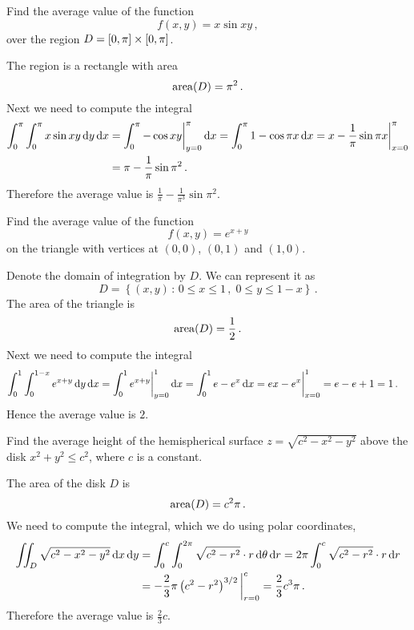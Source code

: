 \begin{question}
Find the average value of the function
\[
f(x,y) = x \sin xy\,,
\]
over the region $D = [0,\pi] \times [0,\pi]$.
\end{question}

\begin{solution}
The region is a rectangle with area
\[
\operatorname{area}(D) = \pi^2\,.
\]
Next we need to compute the integral
\begin{align*}
\int_0^\pi \int_0^\pi x \sin xy \,\mathrm{d} y \,\mathrm{d} x
&= \int_0^\pi -\cos xy \bigg|_{y=0}^\pi \,\mathrm{d} x
= \int_0^\pi 1 - \cos \pi x \,\mathrm{d} x
= x - \frac 1\pi \sin \pi x \bigg|_{x=0}^\pi \\
&= \pi - \frac 1\pi \sin \pi^2\,.
\end{align*}
Therefore the average value is $\frac 1\pi - \frac 1{\pi^3} \sin \pi^2$.
\end{solution}

\begin{question}
Find the average value of the function
\[
f(x,y) = e^{x+y}
\]
on the triangle with vertices at $(0,0)$, $(0,1)$ and $(1,0)$.
\end{question}

\begin{solution}
Denote the domain of integration by $D$. We can represent it as
\[
D = \left\{ (x,y) \,:\, 0 \leq x \leq 1\,,\; 0 \leq y \leq 1-x \right\}\,.
\]
The area of the triangle is
\[
\operatorname{area}(D) = \frac 12\,.
\]
Next we need to compute the integral
\begin{align*}
\int_0^1 \int_0^{1-x} e^{x+y} \,\mathrm{d} y \,\mathrm{d} x 
&= \int_0^1 e^{x+y} \bigg|_{y=0}^1 \,\mathrm{d} x
= \int_0^1 e - e^x \,\mathrm{d} x
= ex - e^x \bigg|_{x=0}^1 = e - e + 1 = 1\,.
\end{align*}
Hence the average value is $2$.
\end{solution}

\begin{question}
Find the average height of the hemispherical surface $z = \sqrt{c^2 - x^2 - y^2}$ above the disk $x^2 + y^2 \leq c^2$, where $c$ is a constant.
\end{question}

\begin{solution}
The area of the disk $D$ is
\[
\operatorname{area}(D) = c^2 \pi\,.
\]
We need to compute the integral, which we do using polar coordinates,
\begin{align*}
\iint_D \sqrt{c^2 - x^2 - y^2} \,\mathrm{d} x \,\mathrm{d} y
&= \int_0^c \int_0^{2\pi} \sqrt{c^2 - r^2} \cdot r \,\mathrm{d} \theta \,\mathrm{d} r
= 2\pi \int_0^c \sqrt{c^2 - r^2} \cdot r \,\mathrm{d} r \\
&= -\frac 23 \pi \left(c^2 - r^2\right)^{3/2} \bigg|_{r=0}^c
= \frac 23 c^3 \pi\,.
\end{align*}
Therefore the average value is $\frac 2{3} c$.
\end{solution}

